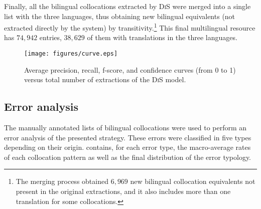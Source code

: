 \documentclass[output=paper
,modfonts
,nonflat]{langsci/langscibook}
\begin{document}
Finally, all the bilingual collocations extracted by \textsc{DiS} were merged
into a single list with the three languages, thus obtaining new bilingual
equivalents (not extracted directly by the system) by transitivity.\footnote{The merging process
  obtained $6,969$ new bilingual collocation equivalents not present in the original extractions, and it also
  includes more than one translation for some collocations.}
This final multilingual resource has $74,942$ entries, $38,629$ of them with translations in the three languages.

\begin{figure}
  \centering
  \texttt{[image: figures/curve.eps]}
  \caption{\label{fig:curva}Average precision, recall, f-score, and confidence
    curves (from 0 to 1) versus total number of extractions of the \textsc{DiS} model.}
\end{figure}

%
\subsection{Error analysis}
\label{garcia:sec:error}
The manually annotated lists of bilingual collocations were used to perform an error analysis
of the presented strategy. These errors were classified in five types depending on
their origin.  contains, for each error type, the macro-average rates
of each collocation pattern as well as the final distribution of the error typology.
\end{document}
